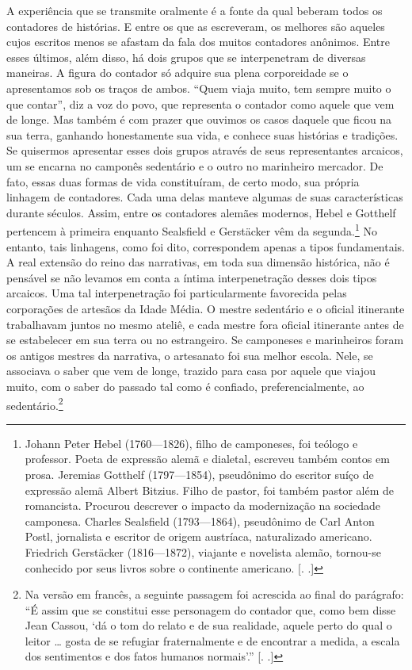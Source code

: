 A experiência que se transmite oralmente é a fonte da qual beberam todos
os contadores de histórias. E entre os que as escreveram, os melhores
são aqueles cujos escritos menos se afastam da fala dos muitos
contadores anônimos. Entre esses últimos, além disso, há dois grupos que
se interpenetram de diversas maneiras. A figura do contador só adquire
sua plena corporeidade se o apresentamos sob os traços de ambos. ``Quem
viaja muito, tem sempre muito o que contar'', diz a voz do povo, que
representa o contador como aquele que vem de longe. Mas também é com
prazer que ouvimos os casos daquele que ficou na sua terra, ganhando
honestamente sua vida, e conhece suas histórias e tradições. Se
quisermos apresentar esses dois grupos através de seus representantes
arcaicos, um se encarna no camponês sedentário e o outro no marinheiro
mercador. De fato, essas duas formas de vida constituíram, de certo
modo, sua própria linhagem de contadores. Cada uma delas manteve algumas
de suas características durante séculos. Assim, entre os contadores
alemães modernos, Hebel e Gotthelf pertencem à primeira enquanto
Sealsfield e Gerstäcker vêm da segunda.\footnote{Johann Peter Hebel
  (1760---1826), filho de camponeses, foi teólogo e professor. Poeta de
  expressão alemã e dialetal, escreveu também contos em prosa. Jeremias
  Gotthelf (1797---1854), pseudônimo do escritor suíço de expressão alemã
  Albert Bitzius. Filho de pastor, foi também pastor além de romancista.
  Procurou descrever o impacto da modernização na sociedade camponesa.
  Charles Sealsfield (1793---1864), pseudônimo de Carl Anton Postl,
  jornalista e escritor de origem austríaca, naturalizado americano.
  Friedrich Gerstäcker (1816---1872), viajante e novelista alemão,
  tornou-se conhecido por seus livros sobre o continente americano.
  [. .]} No entanto, tais linhagens, como foi dito,
correspondem apenas a tipos fundamentais. A real extensão do reino das
narrativas, em toda sua dimensão histórica, não é pensável se não
levamos em conta a íntima interpenetração desses dois tipos arcaicos.
Uma tal interpenetração foi particularmente favorecida pelas corporações
de artesãos da Idade Média. O mestre sedentário e o oficial itinerante trabalhavam juntos no mesmo ateliê, e cada mestre fora oficial itinerante
antes de se estabelecer em sua terra ou no estrangeiro. Se camponeses e
marinheiros foram os antigos mestres da narrativa, o artesanato foi sua
melhor escola. Nele, se associava o saber que vem de longe, trazido para
casa por aquele que viajou muito, com o saber do passado tal como 
é confiado, preferencialmente, ao sedentário.\footnote{Na versão em
  francês, a seguinte passagem foi acrescida ao final do parágrafo: ``É
  assim que se constitui esse personagem do contador que, como bem disse
  Jean Cassou, `dá o tom do relato e de sua realidade, aquele perto do
  qual o leitor \ldots{} gosta de se refugiar fraternalmente e de
  encontrar a medida, a escala dos sentimentos e dos fatos humanos
  normais'.'' [. .]}

